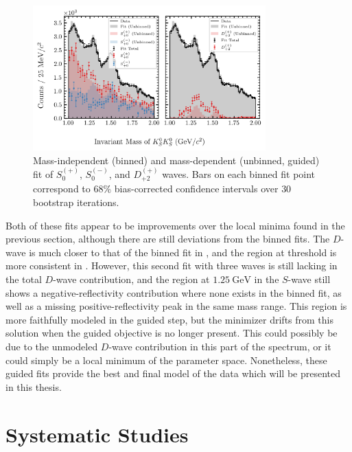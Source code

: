 \begin{figure}
  \begin{center}
    \includegraphics[width=0.8\textwidth]{figures/binned_and_unbinned_fit_chisqdof_3.4_splot_D_1s_2b_guided_phase_factor_waves29099_uncertainty_bootstrap-SE.png}
  \end{center}
  \caption{Mass-independent (binned) and mass-dependent (unbinned, guided) fit of $S_{0}^{(+)}$, $S_{0}^{(-)}$, and $D_{+2}^{(+)}$ waves. Bars on each binned fit point correspond to $68\%$ bias-corrected confidence intervals over $ 30 $ bootstrap iterations.}\label{fig:unbinned-guided-fit-chisqdof-3.4-Spn-D2p}
\end{figure}

Both of these fits appear to be improvements over the local minima found in the previous section, although there are still deviations from the binned fits. The $D$-wave is much closer to that of the binned fit in , and the region at threshold is more consistent in . However, this second fit with three waves is still lacking in the total $D$-wave contribution, and the region at $\SI{1.25}{\giga\electronvolt}$ in the $S$-wave still shows a negative-reflectivity contribution where none exists in the binned fit, as well as a missing positive-reflectivity peak in the same mass range. This region is more faithfully modeled in the guided step, but the minimizer drifts from this solution when the guided objective is no longer present. This could possibly be due to the unmodeled $D$-wave contribution in this part of the spectrum, or it could simply be a local minimum of the parameter space. Nonetheless, these guided fits provide the best and final model of the data which will be presented in this thesis.

\section{Systematic Studies}\label{sec:systematic-studies}

